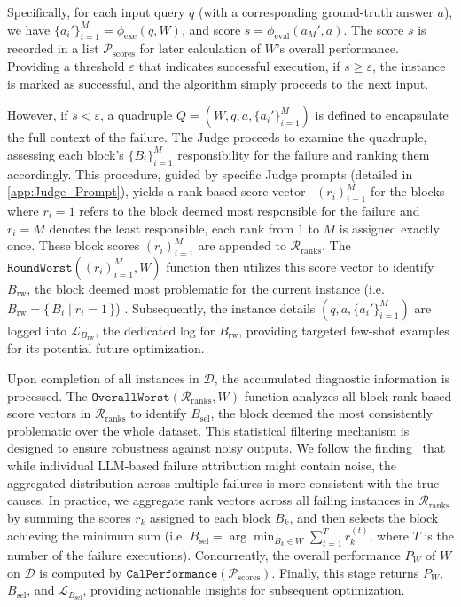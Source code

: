 \documentclass{article}
\theoremstyle{plain}
\theoremstyle{definition}
\theoremstyle{remark}
\begin{document}
Specifically, for each input query $q$ (with a corresponding ground-truth answer $a$), we have $\{a_i'\}_{i=1}^M=\phi_{\text{exe}}(q, W)$, and score $s=\phi_{\text{eval}}(a_M', a)$. The score $s$ is recorded in a list $\mathcal{P}_{\text{scores}}$ for later calculation of $W$'s overall performance. Providing a threshold $\varepsilon$ that indicates successful execution, if $s \geq \varepsilon$, the instance is marked as successful, and the algorithm simply proceeds to the next input.

However, if $s < \varepsilon$, a quadruple $Q=(W, q, a, \{a_i'\}_{i=1}^M)$ is defined to encapsulate the full context of the failure. The Judge proceeds to examine the quadruple, assessing each block's $\{B_i\}_{i=1}^M$ responsibility for the failure and ranking them accordingly. This procedure, guided by specific Judge prompts (detailed in \cref{app:Judge_Prompt}), yields a rank-based score vector~\citep{liu_aligning_2025} $(r_i)_{i=1}^M$ for the blocks where $r_i=1$ refers to the block deemed most responsible for the failure and $r_i=M$ denotes the least responsible, each rank from $1$ to $M$ is assigned exactly once. These block scores $(r_i)_{i=1}^M$ are appended to $\mathcal{R}_{\text{ranks}}$. The $\texttt{RoundWorst}((r_i)_{i=1}^M, W)$ function then utilizes this score vector to identify $B_{\text{rw}}$, the block deemed most problematic for the current instance (i.e. $B_{\text{rw}} = \{\, B_i \mid r_i = 1 \,\}$) . Subsequently, the instance details $(q, a, \{a_i'\}_{i=1}^M)$ are logged into $\mathcal{L}_{B_{\text{rw}}}$, the dedicated log for $B_{\text{rw}}$, providing targeted few-shot examples for its potential future optimization.


Upon completion of all instances in $\mathcal{D}$, the accumulated diagnostic information is processed. The $\texttt{OverallWorst}(\mathcal{R}_{\text{ranks}}, W)$ function analyzes all block rank-based score vectors in $\mathcal{R}_{\text{ranks}}$ to identify $B_{\text{sel}}$, the block deemed the most consistently problematic over the whole dataset. This statistical filtering mechanism is designed to ensure robustness against noisy outputs. We follow the finding~\citep{zhang_which_2025} that while individual LLM-based failure attribution might contain noise, the aggregated distribution across multiple failures is more consistent with the true causes. In practice, we aggregate rank vectors across all failing instances in $\mathcal{R}_{\text{ranks}}$ by summing the scores $r_k$ assigned to each block $B_k$, and then selects the block achieving the minimum sum (i.e. $B_{\text{sel}} = \arg\min_{B_k \in W} \sum_{t=1}^T r_{k}^{(t)}$, where $T$ is the number of the failure executions). Concurrently, the overall performance $P_W$ of $W$ on $\mathcal{D}$ is computed by $\texttt{CalPerformance}(\mathcal{P}_{\text{scores}})$. Finally, this stage returns $P_W$, $B_{\text{sel}}$, and $\mathcal{L}_{B_{\text{sel}}}$, providing actionable insights for subsequent optimization.
\end{document}

